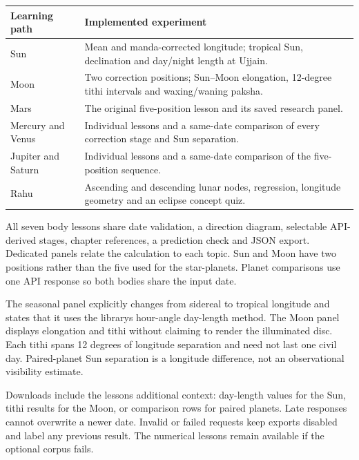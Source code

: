 \documentclass[
]{article}
\begin{document}
\begin{longtable}[]{@{}
  >{\raggedright\arraybackslash}p{}
  >{\raggedright\arraybackslash}p{}@{}}
\toprule\noalign{}
\begin{minipage}[b]{\linewidth}\raggedright
Learning path
\end{minipage} & \begin{minipage}[b]{\linewidth}\raggedright
Implemented experiment
\end{minipage} \\
\midrule\noalign{}
\endhead
\bottomrule\noalign{}
\endlastfoot
Sun & Mean and manda-corrected longitude; tropical Sun, declination and
day/night length at Ujjain. \\
Moon & Two correction positions; Sun--Moon elongation, 12-degree tithi
intervals and waxing/waning paksha. \\
Mars & The original five-position lesson and its saved research
panel. \\
Mercury and Venus & Individual lessons and a same-date comparison of
every correction stage and Sun separation. \\
Jupiter and Saturn & Individual lessons and a same-date comparison of
the five-position sequence. \\
Rahu & Ascending and descending lunar nodes, regression, longitude
geometry and an eclipse concept quiz. \\
\end{longtable}

All seven body lessons share date validation, a direction diagram,
selectable API-derived stages, chapter references, a prediction check
and JSON export. Dedicated panels relate the calculation to each topic.
Sun and Moon have two positions rather than the five used for the
star-planets. Planet comparisons use one API response so both bodies
share the input date.

The seasonal panel explicitly changes from sidereal to tropical
longitude and states that it uses the library\textquotesingle s
hour-angle day-length method. The Moon panel displays elongation and
tithi without claiming to render the illuminated disc. Each tithi spans
12 degrees of longitude separation and need not last one civil day.
Paired-planet Sun separation is a longitude difference, not an
observational visibility estimate.

Downloads include the lesson\textquotesingle s additional context:
day-length values for the Sun, tithi results for the Moon, or comparison
rows for paired planets. Late responses cannot overwrite a newer date.
Invalid or failed requests keep exports disabled and label any previous
result. The numerical lessons remain available if the optional corpus
fails.
\end{document}
